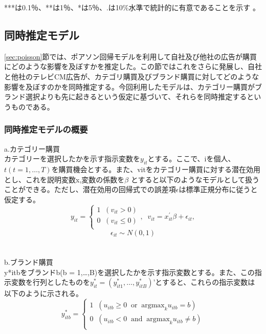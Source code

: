 \documentclass[11pt]{jsarticle}
\begin{document}
***は0.1％、**は1％、*は5％、.は10\%水準で統計的に有意であることを示す 。



\subsection{同時推定モデル}
\label{sec:simultaneous_estimation_model}
\ref{sec:poisson}節では、ポアソン回帰モデルを利用して自社及び他社の広告が購買にどのような影響を及ぼすかを推定した。この節ではこれをさらに発展し、自社と他社のテレビCM広告が、カテゴリ購買及びブランド購買に対してどのような影響を及ぼすのかを同時推定する。今回利用したモデルは、カテゴリー購買がブランド選択よりも先に起きるという仮定に基づいて、それらを同時推定するというものである。

\subsubsection{同時推定モデルの概要}
\label{subsec:simultaneous_summary}
a.カテゴリー購買\\
カテゴリーを選択したかを示す指示変数を$y_{it}$とする。ここで、iを個人、$t(t = 1,\ldots,T)$を購買機会とする。また、vitをカテゴリー購買に対する潜在効用とし、これを説明変数x,変数の係数を$\beta$ とすると以下のようなモデルとして扱うことができる。ただし、潜在効用の回帰式での誤差項$\epsilon$は標準正規分布に従うと仮定する。\\
\begin{equation} \label{formulaa1}
y_{it} = \begin{cases}
             1 \;\; ( v_{it} > 0 )\\
             0 \;\; ( v_{it} \leq 0 )\\
             \end{cases}
             , \;\; v_{it} = x^{\prime}_{it} \beta + \epsilon_{it},
\end{equation}
\begin{equation} \label{formulaa2}
\epsilon_{it} \sim N(0, 1)
\end{equation}\\
\\
b.ブランド購買\\
y*itbをブランドb(b = 1,\ldots,B)を選択したかを示す指示変数とする。また、この指示変数を行列としたものを$y_{it}^{*} = (y_{it1}^{*},\ldots,y_{itB}^{*})’$とすると、これらの指示変数は以下のように示される。\\
\begin{equation} \label{formulab1}
y^\ast_{itb} = \begin{cases}
             1 \;\; ( u_{itb} \geq 0 \;\; \mbox{or} \;\; \mbox{argmax}_{k}u_{itb} = b)\\
             0 \;\; ( u_{itb} < 0 \;\; \mbox{and} \;\; \mbox{argmax}_{k}u_{itb} \neq b)\\
             \end{cases}
\end{equation}\\
\end{document}
